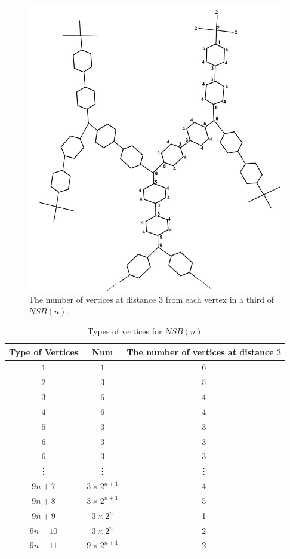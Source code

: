 \documentclass[12pt]{article}
\theoremstyle{theorem}
\theoremstyle{defi}
\begin{document}
\begin{figure}
\label{fig2}
\centering
\includegraphics[width=0.7\linewidth]{img2}
\caption{The number of vertices at distance $3$ from each vertex in a third of $NSB(n)$.}
\end{figure}


\begin{table}
\label{table1}
\begin{center}
\begin{tabular}{ |c|c|c| } 
 \hline
 Type of Vertices & Num & The number of vertices at distance $3$ \\\hline 
 $1$ & $1$ & $6$ \\\hline
 $2$ & $3$ & $5$ \\\hline
 $3$ & $6$ & $4$ \\\hline
 $4$ & $6$ & $4$ \\\hline
 $5$ & $3$ & $3$ \\\hline
 $6$ & $3$ & $3$ \\\hline
 $6$ & $3$ & $3$ \\\hline 
 \vdots & \vdots & \vdots \\\hline
 $9n+7$ & $3\times 2^{n+1}$ & 4\\\hline
 $9n+8$ & $3\times 2^{n+1}$ & 5 \\\hline
 $9n+9$ & $3\times 2^{n}$ & 1\\\hline
 $9n+10$ & $3\times 2^{n}$ & 2\\\hline
 $9n+11$ & $9\times 2^{n+1}$ & 2\\\hline
 \hline
\end{tabular}
\end{center}
\caption{ Types of vertices for $NSB(n)$}
\end{table}
\end{document}
